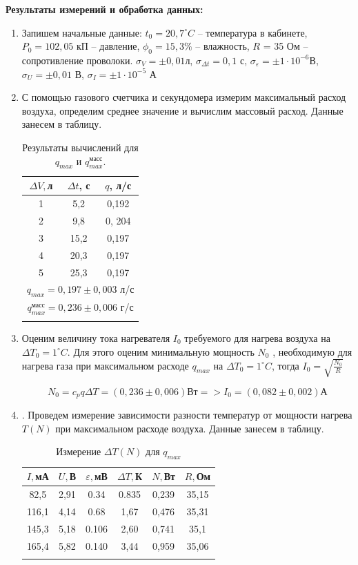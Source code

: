 \documentclass[a4paper, 12pt]{article}%
\begin{document}
	
	\textbf{Результаты измерений и обработка данных: }\\
	\begin{enumerate}
		\item Запишем начальные данные: $t_0 = 20,7^{\circ}C$ -- температура в кабинете, $P_0 = 102,05$ кП -- давление, $\phi_0 = 15,3 \% $ -- влажность, $R$ = 35 Ом -- сопротивление проволоки. $\sigma_V = \pm 0,01$л, $\sigma_{\Delta t} = 0,1$ с, $\sigma_{\varepsilon} = \pm 1 \cdot 10^{-6} $В, $\sigma_U = \pm 0,01$ В, $\sigma_I = \pm 1 \cdot 10^{-5}$ А
		
		\item С помощью газового счетчика и секундомера измерим максимальный расход воздуха, определим среднее значение и вычислим массовый расход. Данные занесем в таблицу.

\newpage

\begin{longtable}{|c|c|c|}
	\hline
	$ \Delta V, $л & $ \Delta t $, с & $ q $, л/с  \\ \hline
	1 & 5,2 & 0,192  \\ \hline
	2 & 9,8& 0, 204 \\ \hline
	3 & 15,2 & 0,197 \\ \hline
	4 & 20,3 & 0,197 \\ \hline
	5 &  25,3 & 0,197 \\ \hline
	\multicolumn{3}{|c|}{$q_{max} = 0,197 \pm 0,003$ л/с}  \\ \hline
	\multicolumn{3}{|c|}{$q_{max}^{\text{масс}} = 0, 236 \pm 0,006$ г/с}  \\ \hline
	\caption{Результаты вычислений для $q_{max}$ и $q_{max}^{\text{масс}}$.}
\end{longtable}

	\item Оценим  величину тока нагревателя $I_0$ требуемого для нагрева воздуха на $\Delta T_0 = 1^{\circ}C$. Для этого оценим минимальную мощность  $N_0$ , необходимую для нагрева газа при максимальном расходе $q_{max}$ на $\Delta T_0 = 1^{\circ}C$, тогда $I_0 = \sqrt {\frac{N_0}{R}}$

	$$N_{0} = c_{p}q\Delta T  = (0, 236 \pm 0,006)\text{Вт}  => I_0 = (0, 082 \pm 0,002) \text{А}$$
	
	\item . Проведем измерение зависимости разности температур от мощности
	нагрева $T(N)$ при максимальном расходе воздуха. Данные занесем в таблицу.
	
\begin{longtable}{|c|c|c|c|c|c|}
	\hline
	$I, $мА & $U, $В &$\varepsilon, $мВ & $ \Delta T, $К & $N, $Вт &  $R, $Ом 
	\\
	\hline
	82,5 & 2,91 & 0.34 & 0.835 & 0,239 &  35,15
	\\
	\hline
	116,1 & 4,14 & 0.68 & 1,67 & 0,476 & 35,31
	\\
	\hline
	145,3 & 5,18 & 0.106 & 2,60 & 0,741 & 35,1
	\\
	\hline
	165,4 & 5,82 & 0.140 & 3,44 & 0,959 & 35,06
	\\
	\hline
	\caption{Измерение $\Delta T (N)$ для $ q_{max}$}
\end{longtable}


\end{enumerate}
\end{document}
